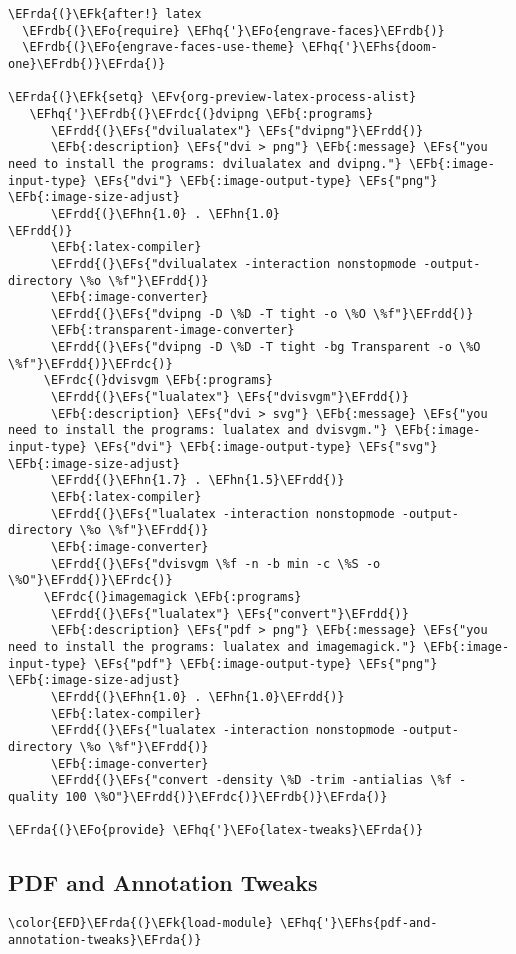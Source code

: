 \documentclass[a4wide,10pt]{article}
\newcommand{\EFs}[1]{\textcolor{EFs}{#1}} %
\newcommand{\EFk}[1]{\textcolor{EFk}{#1}} %
\newcommand{\EFb}[1]{\textcolor{EFb}{#1}} %
\newcommand{\EFv}[1]{\textcolor{EFv}{#1}} %
\newcommand{\EFo}[1]{\textcolor{EFo}{#1}} %
\newcommand{\EFhn}[1]{\textcolor{EFhn}{\textbf{#1}}} %
\newcommand{\EFhq}[1]{\textcolor{EFhq}{#1}} %
\newcommand{\EFhs}[1]{\textcolor{EFhs}{#1}} %
\newcommand{\EFrda}[1]{\textcolor{EFrda}{#1}} %
\newcommand{\EFrdb}[1]{\textcolor{EFrdb}{#1}} %
\newcommand{\EFrdc}[1]{\textcolor{EFrdc}{#1}} %
\newcommand{\EFrdd}[1]{\textcolor{EFrdd}{#1}} %
\begin{document}
\begin{Code}
\begin{Verbatim}
\EFrda{(}\EFk{after!} latex
  \EFrdb{(}\EFo{require} \EFhq{'}\EFo{engrave-faces}\EFrdb{)}
  \EFrdb{(}\EFo{engrave-faces-use-theme} \EFhq{'}\EFhs{doom-one}\EFrdb{)}\EFrda{)}

\EFrda{(}\EFk{setq} \EFv{org-preview-latex-process-alist}
   \EFhq{'}\EFrdb{(}\EFrdc{(}dvipng \EFb{:programs}
      \EFrdd{(}\EFs{"dvilualatex"} \EFs{"dvipng"}\EFrdd{)}
      \EFb{:description} \EFs{"dvi > png"} \EFb{:message} \EFs{"you need to install the programs: dvilualatex and dvipng."} \EFb{:image-input-type} \EFs{"dvi"} \EFb{:image-output-type} \EFs{"png"} \EFb{:image-size-adjust}
      \EFrdd{(}\EFhn{1.0} . \EFhn{1.0}
\EFrdd{)}
      \EFb{:latex-compiler}
      \EFrdd{(}\EFs{"dvilualatex -interaction nonstopmode -output-directory \%o \%f"}\EFrdd{)}
      \EFb{:image-converter}
      \EFrdd{(}\EFs{"dvipng -D \%D -T tight -o \%O \%f"}\EFrdd{)}
      \EFb{:transparent-image-converter}
      \EFrdd{(}\EFs{"dvipng -D \%D -T tight -bg Transparent -o \%O \%f"}\EFrdd{)}\EFrdc{)}
     \EFrdc{(}dvisvgm \EFb{:programs}
      \EFrdd{(}\EFs{"lualatex"} \EFs{"dvisvgm"}\EFrdd{)}
      \EFb{:description} \EFs{"dvi > svg"} \EFb{:message} \EFs{"you need to install the programs: lualatex and dvisvgm."} \EFb{:image-input-type} \EFs{"dvi"} \EFb{:image-output-type} \EFs{"svg"} \EFb{:image-size-adjust}
      \EFrdd{(}\EFhn{1.7} . \EFhn{1.5}\EFrdd{)}
      \EFb{:latex-compiler}
      \EFrdd{(}\EFs{"lualatex -interaction nonstopmode -output-directory \%o \%f"}\EFrdd{)}
      \EFb{:image-converter}
      \EFrdd{(}\EFs{"dvisvgm \%f -n -b min -c \%S -o \%O"}\EFrdd{)}\EFrdc{)}
     \EFrdc{(}imagemagick \EFb{:programs}
      \EFrdd{(}\EFs{"lualatex"} \EFs{"convert"}\EFrdd{)}
      \EFb{:description} \EFs{"pdf > png"} \EFb{:message} \EFs{"you need to install the programs: lualatex and imagemagick."} \EFb{:image-input-type} \EFs{"pdf"} \EFb{:image-output-type} \EFs{"png"} \EFb{:image-size-adjust}
      \EFrdd{(}\EFhn{1.0} . \EFhn{1.0}\EFrdd{)}
      \EFb{:latex-compiler}
      \EFrdd{(}\EFs{"lualatex -interaction nonstopmode -output-directory \%o \%f"}\EFrdd{)}
      \EFb{:image-converter}
      \EFrdd{(}\EFs{"convert -density \%D -trim -antialias \%f -quality 100 \%O"}\EFrdd{)}\EFrdc{)}\EFrdb{)}\EFrda{)}

\EFrda{(}\EFo{provide} \EFhq{'}\EFo{latex-tweaks}\EFrda{)}
\end{Verbatim}
\end{Code}
\subsection{PDF and Annotation Tweaks}
\label{sec:org8406366}
\begin{Code}
\begin{Verbatim}
\color{EFD}\EFrda{(}\EFk{load-module} \EFhq{'}\EFhs{pdf-and-annotation-tweaks}\EFrda{)}
\end{Verbatim}
\end{Code}
\end{document}
